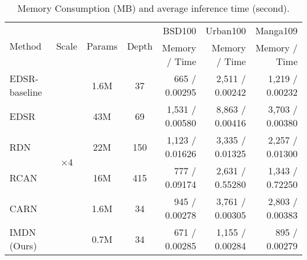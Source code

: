 \documentclass[sigconf]{acmart}
\begin{document}
\begin{table*}[htpb]
	\caption{Memory Consumption (MB) and average inference time (second).}
	\label{tab:memory-time}
	\begin{center}
		\begin{tabular}{|l|c|c|c|r|r|r|}
			\hline
			\multirow{2}{*}{Method} & \multirow{2}{*}{Scale} & \multirow{2}{*}{Params} & \multirow{2}{*}{Depth} & BSD100 & Urban100 & Manga109 \\
			\cline{5-7}
			& & & & Memory / Time & Memory / Time & Memory / Time \\
			\hline
			\hline
			EDSR-baseline~\cite{EDSR} & \multirow{6}{*}{$\times 4$} & 1.6M & 37 & 665 / 0.00295 & 2,511 / 0.00242 & 1,219 / 0.00232 \\
			
			EDSR~\cite{EDSR} &  & 43M & 69 & 1,531 / 0.00580 & 8,863 / 0.00416 & 3,703 / 0.00380 \\
			
			RDN~\cite{RDN} &  & 22M & 150 & 1,123 / 0.01626 & 3,335 / 0.01325 & 2,257 / 0.01300 \\
			
			RCAN~\cite{RCAN} &  & 16M & 415 & 777 / 0.09174 & 2,631 / 0.55280 & 1,343 / 0.72250 \\
			
			CARN~\cite{CARN} &  & 1.6M & 34 & 945 / 0.00278 & 3,761 / 0.00305 & 2,803 / 0.00383 \\
			
			IMDN (Ours) & & 0.7M & 34 & 671 / 0.00285 & 1,155 / 0.00284 & 895 / 0.00279 \\
			
			\hline
		\end{tabular}
	\end{center}
\end{table*}
\end{document}
